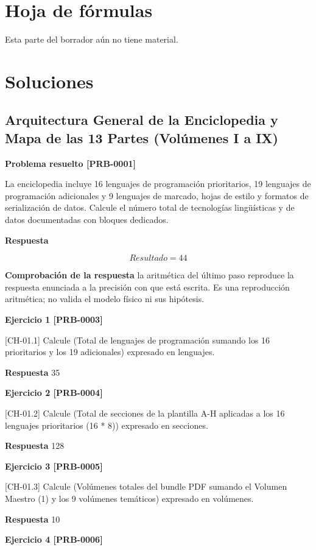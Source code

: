 \documentclass{book}
\begin{document}
\chapter{Hoja de fórmulas}

\noindent Esta parte del borrador aún no tiene material.
\chapter{Soluciones}

\section{Arquitectura General de la Enciclopedia y Mapa de las 13 Partes (Volúmenes I a IX)}

\noindent\textbf{Problema resuelto [PRB-0001]}

La enciclopedia incluye 16 lenguajes de programación prioritarios, 19 lenguajes de programación adicionales y 9 lenguajes de marcado, hojas de estilo y formatos de serialización de datos. Calcule el número total de tecnologías lingüísticas y de datos documentadas con bloques dedicados.

\noindent\textbf{Respuesta}

\[
Resultado = 44
\]

\noindent\textbf{Comprobación de la respuesta} la aritmética del último paso reproduce la respuesta enunciada a la precisión con que está escrita. Es una reproducción aritmética; no valida el modelo físico ni sus hipótesis.

\noindent\textbf{Ejercicio 1 [PRB-0003]}

[CH-01.1] Calcule (Total de lenguajes de programación sumando los 16 prioritarios y los 19 adicionales) expresado en lenguajes.

\noindent\textbf{Respuesta} 35

\noindent\textbf{Ejercicio 2 [PRB-0004]}

[CH-01.2] Calcule (Total de secciones de la plantilla A-H aplicadas a los 16 lenguajes prioritarios (16 * 8)) expresado en secciones.

\noindent\textbf{Respuesta} 128

\noindent\textbf{Ejercicio 3 [PRB-0005]}

[CH-01.3] Calcule (Volúmenes totales del bundle PDF sumando el Volumen Maestro (1) y los 9 volúmenes temáticos) expresado en volúmenes.

\noindent\textbf{Respuesta} 10

\noindent\textbf{Ejercicio 4 [PRB-0006]}
\end{document}
